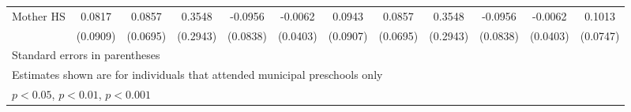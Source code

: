 \begin{table}[htbp]
\begin{tabular}{l*{11}{c}}
\addlinespace
Mother HS   &      0.0817         &      0.0857         &      0.3548         &     -0.0956         &     -0.0062         &      0.0943         &      0.0857         &      0.3548         &     -0.0956         &     -0.0062         &      0.1013         \\
            &    (0.0909)         &    (0.0695)         &    (0.2943)         &    (0.0838)         &    (0.0403)         &    (0.0907)         &    (0.0695)         &    (0.2943)         &    (0.0838)         &    (0.0403)         &    (0.0747)         \\
\bottomrule
\multicolumn{12}{l}{\footnotesize Standard errors in parentheses}\\
\multicolumn{12}{l}{\footnotesize Estimates shown are for individuals that attended municipal preschools only}\\
\multicolumn{12}{l}{\footnotesize \sym{*} \(p<0.05\), \sym{**} \(p<0.01\), \sym{***} \(p<0.001\)}\\
\end{tabular}
\end{table}
